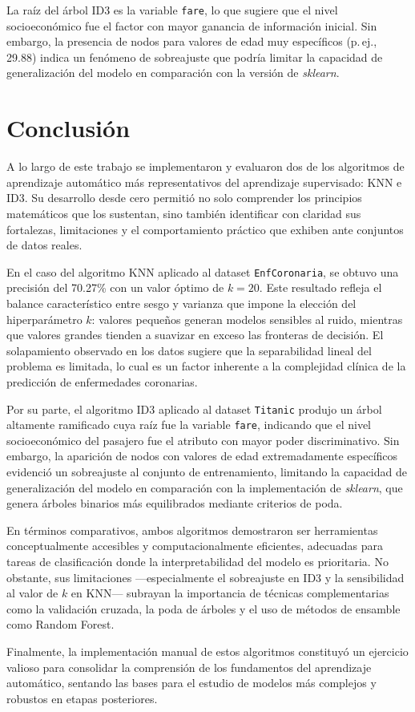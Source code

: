 \documentclass[12pt]{article}
\begin{document}
La raíz del árbol ID3 es la variable \texttt{fare}, lo que sugiere que el nivel socioeconómico fue el factor con mayor ganancia de información inicial. Sin embargo, la presencia de nodos para valores de edad muy específicos (p.\,ej., 29.88) indica un fenómeno de sobreajuste que podría limitar la capacidad de generalización del modelo en comparación con la versión de \textit{sklearn}.

\section{Conclusión}

A lo largo de este trabajo se implementaron y evaluaron dos de los algoritmos de aprendizaje automático más representativos del aprendizaje supervisado: KNN e ID3. Su desarrollo desde cero permitió no solo comprender los principios matemáticos que los sustentan, sino también identificar con claridad sus fortalezas, limitaciones y el comportamiento práctico que exhiben ante conjuntos de datos reales.

En el caso del algoritmo KNN aplicado al dataset \texttt{EnfCoronaria}, se obtuvo una precisión del 70.27\% con un valor óptimo de $k=20$. Este resultado refleja el balance característico entre sesgo y varianza que impone la elección del hiperparámetro $k$: valores pequeños generan modelos sensibles al ruido, mientras que valores grandes tienden a suavizar en exceso las fronteras de decisión. El solapamiento observado en los datos sugiere que la separabilidad lineal del problema es limitada, lo cual es un factor inherente a la complejidad clínica de la predicción de enfermedades coronarias.

Por su parte, el algoritmo ID3 aplicado al dataset \texttt{Titanic} produjo un árbol altamente ramificado cuya raíz fue la variable \texttt{fare}, indicando que el nivel socioeconómico del pasajero fue el atributo con mayor poder discriminativo. Sin embargo, la aparición de nodos con valores de edad extremadamente específicos evidenció un sobreajuste al conjunto de entrenamiento, limitando la capacidad de generalización del modelo en comparación con la implementación de \textit{sklearn}, que genera árboles binarios más equilibrados mediante criterios de poda.

En términos comparativos, ambos algoritmos demostraron ser herramientas conceptualmente accesibles y computacionalmente eficientes, adecuadas para tareas de clasificación donde la interpretabilidad del modelo es prioritaria. No obstante, sus limitaciones ---especialmente el sobreajuste en ID3 y la sensibilidad al valor de $k$ en KNN--- subrayan la importancia de técnicas complementarias como la validación cruzada, la poda de árboles y el uso de métodos de ensamble como Random Forest.

Finalmente, la implementación manual de estos algoritmos constituyó un ejercicio valioso para consolidar la comprensión de los fundamentos del aprendizaje automático, sentando las bases para el estudio de modelos más complejos y robustos en etapas posteriores.

\printbibliography[title={Referencias Bibliográficas}]
\end{document}
